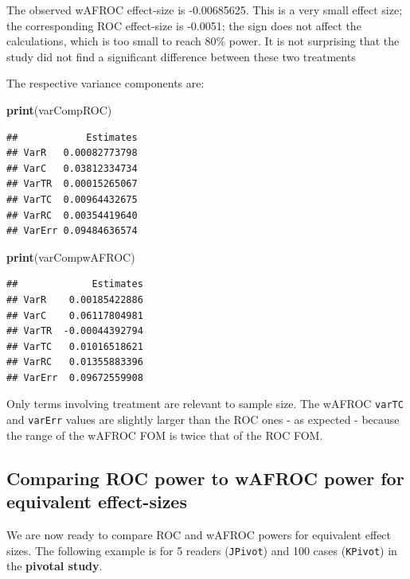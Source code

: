 \documentclass[
]{book}
\newenvironment{Shaded}{\begin{snugshade}}{\end{snugshade}}
\newcommand{\KeywordTok}[1]{\textcolor[rgb]{0.13,0.29,0.53}{\textbf{#1}}}
\newcommand{\NormalTok}[1]{#1}
\begin{document}
The observed wAFROC effect-size is -0.00685625. This is a very small effect size; the corresponding ROC effect-size is -0.0051; the sign does not affect the calculations, which is too small to reach 80\% power. It is not surprising that the study \citep{RN1882} did not find a significant difference between these two treatments

The respective variance components are:

\begin{Shaded}
\begin{Highlighting}[]
\KeywordTok{print}\NormalTok{(varCompROC)}
\end{Highlighting}
\end{Shaded}

\begin{verbatim}
##            Estimates
## VarR   0.00082773798
## VarC   0.03812334734
## VarTR  0.00015265067
## VarTC  0.00964432675
## VarRC  0.00354419640
## VarErr 0.09484636574
\end{verbatim}

\begin{Shaded}
\begin{Highlighting}[]
\KeywordTok{print}\NormalTok{(varCompwAFROC)}
\end{Highlighting}
\end{Shaded}

\begin{verbatim}
##             Estimates
## VarR    0.00185422886
## VarC    0.06117804981
## VarTR  -0.00044392794
## VarTC   0.01016518621
## VarRC   0.01355883396
## VarErr  0.09672559908
\end{verbatim}

Only terms involving treatment are relevant to sample size. The wAFROC \texttt{varTC} and \texttt{varErr} values are slightly larger than the ROC ones - as expected - because the range of the wAFROC FOM is twice that of the ROC FOM.

\hypertarget{comparing-roc-power-to-wafroc-power-for-equivalent-effect-sizes}{%
\subsection{Comparing ROC power to wAFROC power for equivalent effect-sizes}\label{comparing-roc-power-to-wafroc-power-for-equivalent-effect-sizes}}

We are now ready to compare ROC and wAFROC powers for equivalent effect sizes. The following example is for 5 readers (\texttt{JPivot}) and 100 cases (\texttt{KPivot}) in the \textbf{pivotal study}.
\end{document}
